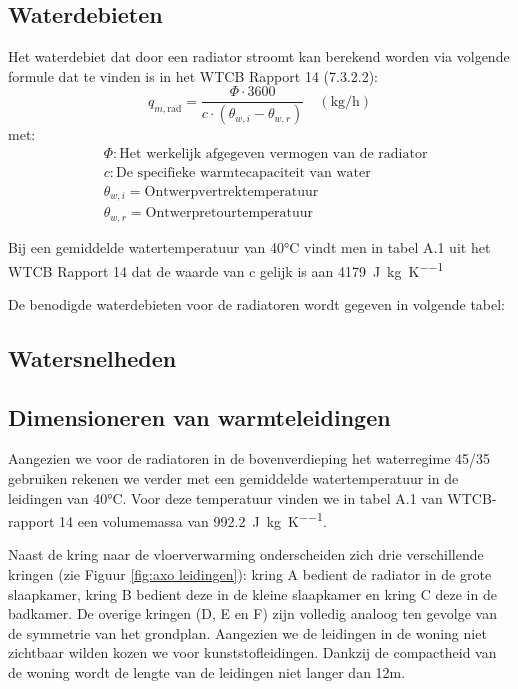 \documentclass[a4paper,12pt]{article}
\begin{document}
\subsection{Waterdebieten}
Het waterdebiet dat door een radiator stroomt kan berekend worden via volgende formule dat te vinden is in het WTCB Rapport 14 (7.3.2.2): 
\begin{equation}
    q_{m,\mathrm{rad}} = \frac{\Phi \cdot 3600}{c \cdot \left( \theta_{w,i} - \theta_{w,r} \right)} \quad (\mathrm{kg/h})
    \label{eq:placeholder_label}
\end{equation}
met:
\begin{equation*}
\begin{aligned}
    &\Phi : \text{Het werkelijk afgegeven vermogen van de radiator} \\
    &c : \text{De specifieke warmtecapaciteit van water} \\
    &\theta_{w,i} = \text{Ontwerpvertrektemperatuur} \\
    &\theta_{w,r} = \text{Ontwerpretourtemperatuur} \\
    \\
\end{aligned}
\end{equation*}
Bij een gemiddelde watertemperatuur van 40°C vindt men in tabel A.1 uit het WTCB Rapport 14 dat de waarde van c gelijk is aan \qty{4179}{\joule\per\kilo\gram\per\kelvin} 

De benodigde waterdebieten voor de radiatoren wordt gegeven in volgende tabel:

\subsection{Watersnelheden}



\subsection{Dimensioneren van warmteleidingen}
 Aangezien we voor de radiatoren in de bovenverdieping het waterregime 45/35 gebruiken rekenen we verder met een gemiddelde watertemperatuur in de leidingen van 40°C.  Voor deze temperatuur vinden we in tabel A.1 van WTCB-rapport 14 een volumemassa van \qty{992,2}{\joule\per\kilo\gram\per\kelvin}.

 Naast de kring naar de vloerverwarming onderscheiden zich drie verschillende kringen (zie Figuur \ref{fig:axo leidingen}): kring A bedient de radiator in de grote slaapkamer, kring B bedient deze in de kleine slaapkamer en kring C deze in de badkamer. De overige kringen (D, E en F) zijn volledig analoog ten gevolge van de symmetrie van het grondplan.
 Aangezien we de leidingen in de woning niet zichtbaar wilden kozen we voor kunststofleidingen. Dankzij de compactheid van de woning wordt de lengte van de leidingen niet langer dan 12m.
\end{document}
